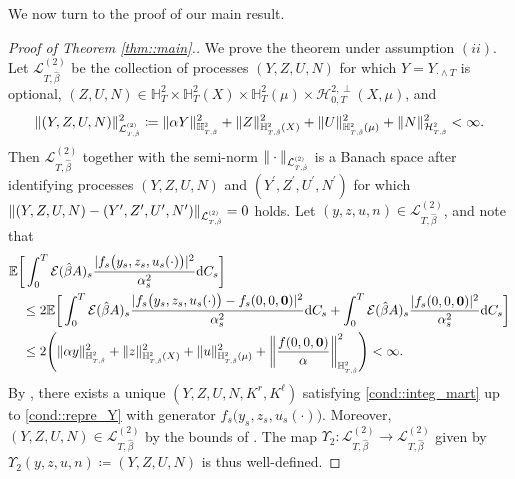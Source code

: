 \documentclass[10pt]{article} %
\newcommand\cE{\mathcal E}
\newcommand\cH{\mathcal H}
\newcommand\cL{\mathcal L}
\newcommand{\smalltext}[1]{\text{\fontsize{4}{4}\selectfont$#1$}}
\def \E{\mathbb{E}}
\def \H{\mathbb{H}}
\newcommand{\1}{\mathbf{1}}
\def\d{\mathrm{d}}
\begin{document}
We now turn to the proof of our main result.

\begin{proof}[Proof of Theorem \ref{thm::main}.]\label{proof::main}
	We prove the theorem under assumption $(ii)$. Let $\cL^{(2)}_{T,\hat\beta}$ be the collection of processes $(Y,Z,U,N)$ for which $Y = Y_{\cdot \land T}$ is optional, $(Z,U,N) \in \H^2_T \times \H^2_T(X) \times \H^2_T(\mu) \times \cH^{2,\perp}_{0,T}(X,\mu)$, and
	\begin{equation*}
		\|(Y,Z,U,N)\|^2_{\cL^\smalltext{(2)}_{\smalltext{T}\smalltext{,}\smalltext{\hat\beta}}} \coloneqq \|\alpha Y\|^2_{\H^\smalltext{2}_{\smalltext{T}\smalltext{,}\smalltext{\hat\beta}}} + \|Z\|^2_{\H^\smalltext{2}_{\smalltext{T}\smalltext{,}\smalltext{\hat\beta}}(X)} + \|U\|^2_{\H^\smalltext{2}_{\smalltext{T}\smalltext{,}\smalltext{\hat\beta}}(\mu)} + \|N\|^2_{\cH^\smalltext{2}_{\smalltext{T}\smalltext{,}\smalltext{\hat\beta}}} < \infty.
	\end{equation*}
	Then $\cL^{(2)}_{T,\hat\beta}$ together with the semi-norm $\|\cdot\|_{\cL^\smalltext{(2)}_{\smalltext{T}\smalltext{,}\smalltext{\hat\beta}}}$ is a Banach space after identifying processes $(Y,Z,U,N)$ and $(Y^\prime,Z^\prime,U^\prime,N^\prime)$ for which $\|(Y,Z,U,N) - (Y^\prime,Z^\prime,U^\prime,N^\prime)\|_{\cL^\smalltext{(2)}_{\smalltext{T}\smalltext{,}\smalltext{\hat\beta}}} = 0$ holds. Let $(y,z,u,n) \in \cL^{(2)}_{T,\hat\beta}$, and note that
	\begin{align*}
		&\E \bigg[ \int_0^T \cE(\hat\beta A)_s \frac{|f_s\big(y_s,z_s,u_s(\cdot)\big)|^2}{\alpha^2_s} \d C_s\bigg] \\ 
		&\quad\leq 2 \E \bigg[ \int_0^T \cE(\hat\beta A)_s \frac{|f_s\big(y_s,z_s,u_s(\cdot)\big) - f_s(0,0,{\bf 0})|^2}{\alpha^2_s} \d C_s 
		+ \int_0^T \cE(\hat\beta A)_s \frac{|f_s(0,0,{\bf 0})|^2}{\alpha^2_s} \d C_s \bigg] \\
		&\quad\leq 2\Bigg( \|\alpha y\|^2_{\H^\smalltext{2}_{\smalltext{T}\smalltext{,}\smalltext{\hat\beta}}} + \|z\|^2_{\H^\smalltext{2}_{\smalltext{T}\smalltext{,}\smalltext{\hat\beta}}(X)} + \|u\|^2_{\H^\smalltext{2}_{\smalltext{T}\smalltext{,}\smalltext{\hat\beta}}(\mu)} + \bigg\|\frac{f(0,0,\mathbf{0})}{\alpha}\bigg\|^2_{\H^\smalltext{2}_{\smalltext{T}\smalltext{,}\smalltext{\hat\beta}}}\Bigg) < \infty.
	\end{align*}
	By , there exists a unique $(Y,Z,U,N,K^r,K^\ell)$ satisfying \ref{cond::integ_mart} up to \ref{cond::repre_Y} with generator $f_s\big(y_s,z_s,u_s(\cdot)\big)$. Moreover, $(Y,Z,U,N) \in \cL^{(2)}_{T,\hat\beta}$ by the bounds of . The map $\Upsilon_2 : \cL^{(2)}_{T,\hat\beta} \longrightarrow \cL^{(2)}_{T,\hat\beta}$ given by $\Upsilon_2(y, z, u, n) \coloneqq (Y, Z, U, N)$ is thus well-defined. 
	

\end{proof}
\end{document}
